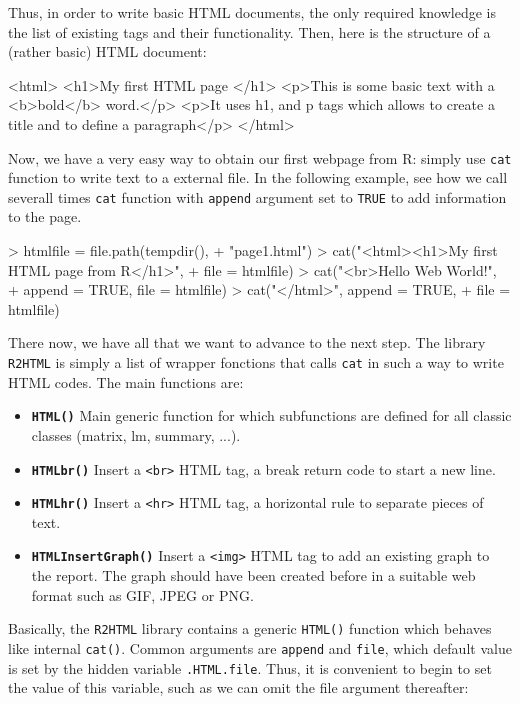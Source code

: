 \documentclass[a4paper]{article}
\newcommand{\HTML}{{\tt R2HTML}}
\begin{document}
Thus, in order to write basic HTML documents, the only required knowledge is the list of existing tags and their functionality. Then, here is the structure of a (rather basic) HTML document:

\begin{smallverbatim}
<html>
<h1>My first HTML page </h1>
<p>This is some basic text with a 
   <b>bold</b> word.</p>
<p>It uses h1, and p tags which allows to create
   a title and to define a paragraph</p>
</html>
\end{smallverbatim}

Now, we have a very easy way to obtain our first webpage from R: simply use \verb+cat+ function to write text to a external file. In the following example, see how we call severall times \verb+cat+ function with \verb+append+ argument set to \verb+TRUE+ to add information to the page.

\begin{Schunk}
\begin{Sinput}
> htmlfile = file.path(tempdir(), 
+     "page1.html")
> cat("<html><h1>My first HTML page from R</h1>", 
+     file = htmlfile)
> cat("\n<br>Hello Web World!", 
+     append = TRUE, file = htmlfile)
> cat("\n</html>", append = TRUE, 
+     file = htmlfile)
\end{Sinput}
\end{Schunk}

There now, we have all that we want to advance to the next step. The library \HTML{} is simply a list of wrapper fonctions that calls \verb+cat+ in such a way to write HTML codes. The main functions are:

\begin{itemize}
\item {\bf \verb+HTML()+} Main generic function for which subfunctions are defined for all classic classes (matrix, lm, summary, ...).
\item {\bf \verb+HTMLbr()+} Insert a \verb+<br>+ HTML tag, a break return code to start a new line.
\item {\bf \verb+HTMLhr()+} Insert a \verb+<hr>+ HTML tag, a horizontal rule to separate pieces of text.
\item {\bf \verb+HTMLInsertGraph()+} Insert a \verb+<img>+ HTML tag to add an existing graph to the report. The graph should have been created before in a suitable web format such as GIF, JPEG or PNG.
\end{itemize}

Basically, the \HTML{} library contains a generic \verb+HTML()+ function which behaves like internal \verb+cat()+. Common arguments are \verb+append+ and \verb+file+, which default value is set by the hidden variable  \verb+.HTML.file+. Thus, it is convenient to begin to set the value of this variable, such as we can omit the file argument thereafter:
\end{document}
